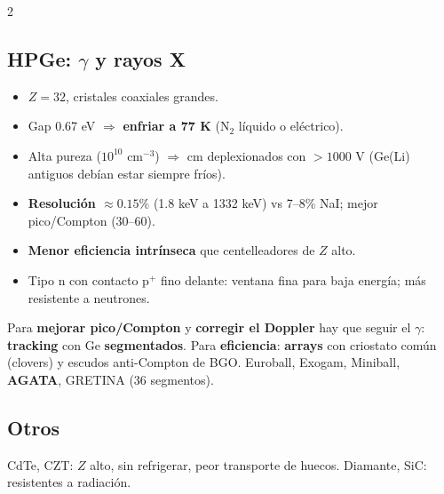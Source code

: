 \documentclass[10pt,a4paper]{article}
\newcommand{\imp}[1]{\textbf{\color{BrickRed}#1}}
\begin{document}
\begin{multicols}{2}
\subsection{HPGe: $\gamma$ y rayos X}
\begin{itemize}
\item $Z=32$, cristales coaxiales grandes.
\item Gap 0.67 eV $\Rightarrow$ \imp{enfriar a 77 K} (N$_2$ líquido o eléctrico).
\item Alta pureza ($10^{10}$ cm$^{-3}$) $\Rightarrow$ cm deplexionados con $>1000$ V (Ge(Li) antiguos debían estar siempre fríos).
\item \imp{Resolución $\approx0.15\%$} (1.8 keV a 1332 keV) vs 7--8\% NaI; mejor pico/Compton (30--60).
\item \imp{Menor eficiencia intrínseca} que centelleadores de $Z$ alto.
\item Tipo n con contacto p$^+$ fino delante: ventana fina para baja energía; más resistente a neutrones.
\end{itemize}
\begin{clave}
Para \textbf{mejorar pico/Compton} y \textbf{corregir el Doppler} hay que seguir el $\gamma$: \imp{tracking} con Ge \textbf{segmentados}.
Para \textbf{eficiencia}: \textbf{arrays} con criostato común (clovers) y escudos anti-Compton de BGO.
Euroball, Exogam, Miniball, \textbf{AGATA}, GRETINA (36 segmentos).
\end{clave}
\subsection{Otros}
CdTe, CZT: $Z$ alto, sin refrigerar, peor transporte de huecos. Diamante, SiC: resistentes a radiación.
\end{multicols}
\newpage

\end{document}
